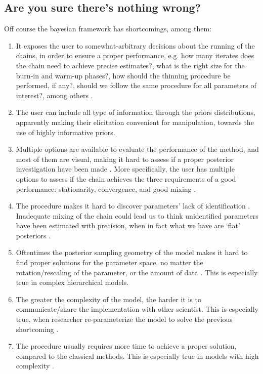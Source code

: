 
\subsection{Are you sure there's nothing wrong?} \label{sub_sect:bads}
Off course the bayesian framework has shortcomings, among them:

\begin{enumerate}	
	\item It exposes the user to somewhat-arbitrary decisions about the running of the chains, in order to ensure a proper performance, e.g. how many iterates does the chain need to achieve precise estimates?, what is the right size for the burn-in and warm-up phases?, how should the thinning procedure be performed, if any?, should we follow the same procedure for all parameters of interest?, among others \cite{Skrondal_et_al_2004a}. 
	
	\item The user can include all type of information through the priors distributions, apparently making their elicitation convenient for manipulation, towards the use of highly informative priors.
	
	\item Multiple options are available to evaluate the performance of the method, and most of them are visual, making it hard to assess if a proper posterior investigation have been made \cite{Gelman_et_al_1996a}. More specifically, the user has multiple options to assess if the chain achieves the three requirements of a good performance: stationarity, convergence, and good mixing \cite{McElreath_2020}. 
	
	\item The procedure makes it hard to discover parameters' lack of identification \cite{Skrondal_et_al_2004a}. Inadequate mixing of the chain could lead us to think unidentified parameters have been estimated with precision, when in fact what we have are `flat' posteriors \cite{Keane_1992}.
	
	\item Oftentimes the posterior sampling geometry of the model makes it hard to find proper solutions for the parameter space, no matter the rotation/rescaling of the parameter, or the amount of data \cite{Betancourt_et_al_2013}. This is especially true in complex hierarchical models.
	
	\item The greater the complexity of the model, the harder it is to communicate/share the implementation with other scientist. This is especially true, when researcher re-parameterize the model to solve the previous shortcoming \cite{McElreath_2020}.
	
	\item The procedure usually requires more time to achieve a proper solution, compared to the classical methods. This is especially true in models with high complexity \cite{Tarazona_2013, Rivera_2019}.
\end{enumerate}

